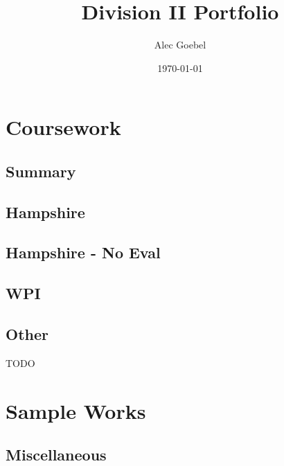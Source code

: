 \documentclass[letterpaper,twoside]{report}
\title{Division II Portfolio}
\author{Alec Goebel}
\date{\today}
\begin{document}
\maketitle
\tableofcontents




 
\part{Coursework}

\chapter{Summary}

\chapter{Hampshire}













\chapter{Hampshire - No Eval}





\chapter{WPI}











%
%

\chapter{Other}
TODO

\part{Sample Works}



\chapter{Miscellaneous}

\end{document}
